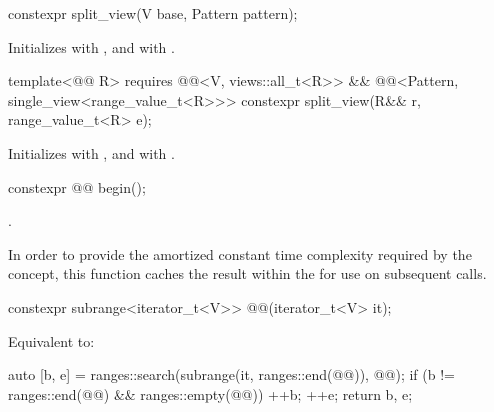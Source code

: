 \begin{itemdecl}
constexpr split_view(V base, Pattern pattern);
\end{itemdecl}

\begin{itemdescr}
\pnum
\effects
Initializes  with , and
 with .
\end{itemdescr}

%
\begin{itemdecl}
template<@@ R>
  requires @@<V, views::all_t<R>> &&
           @@<Pattern, single_view<range_value_t<R>>>
constexpr split_view(R&& r, range_value_t<R> e);
\end{itemdecl}

\begin{itemdescr}
\pnum
\effects
Initializes  with , and
 with .
\end{itemdescr}

\begin{itemdecl}
constexpr @@ begin();
\end{itemdecl}

\begin{itemdescr}
\pnum
\returns
{}.

\pnum
\remarks
In order to provide the amortized constant time complexity
required by the  concept,
this function caches the result within the 
for use on subsequent calls.
\end{itemdescr}

\begin{itemdecl}
constexpr subrange<iterator_t<V>> @@(iterator_t<V> it);
\end{itemdecl}

\begin{itemdescr}
\pnum
\effects
Equivalent to:
\begin{codeblock}
auto [b, e] = ranges::search(subrange(it, ranges::end(@@)), @@);
if (b != ranges::end(@@) && ranges::empty(@@)) {
  ++b;
  ++e;
}
return {b, e};
\end{codeblock}
\end{itemdescr}

